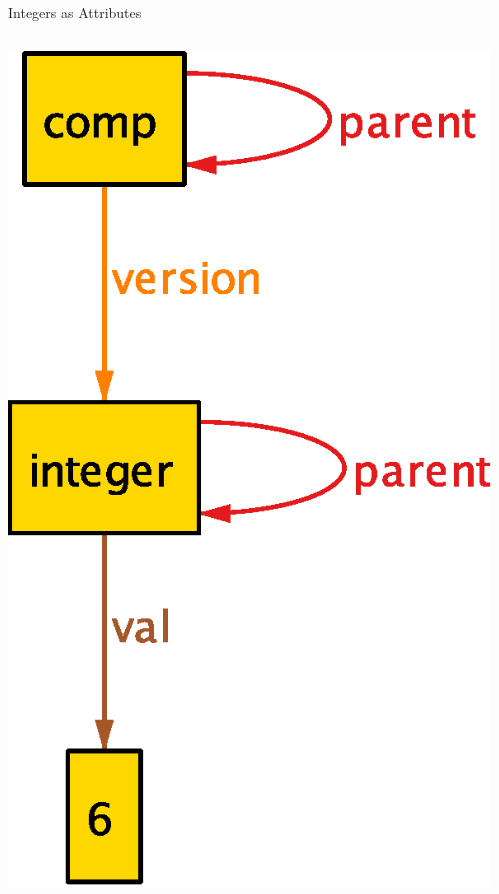 \documentclass[table,15pt,t]{beamer}
\newcounter{i}
\begin{document}
\begin{frame}{Integers as Attributes} %
  \begin{columns}
    \begin{column}{0.5\textwidth}
      \includegraphics[scale=0.5]{figs/integer-old}
    \end{column}
    \begin{column}{0.5\textwidth}

\end{column}
\end{columns}
\end{frame}
\end{document}
